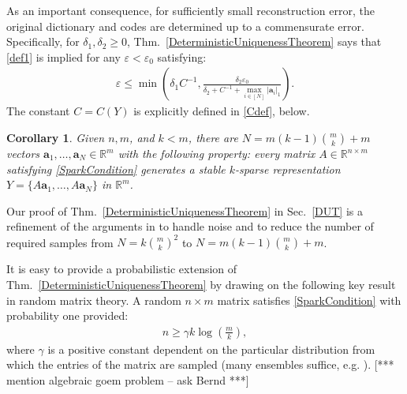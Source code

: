 \documentclass[journal, twocolumn]{IEEEtran}
\newtheorem{corollary}{Corollary}
\begin{document}

As an important consequence, for sufficiently small reconstruction error, the original dictionary and codes are determined up to a commensurate error. Specifically, for $\delta_1, \delta_2 \geq 0$, Thm.~\ref{DeterministicUniquenessTheorem} says that \eqref{def1} is implied for any $\varepsilon < \varepsilon_0$ satisfying:
\begin{align*}
\varepsilon \leq \min \left( \delta_1 C^{-1}, \frac{ \delta_2 \varepsilon_0}{\delta_2 + C^{-1} + \max_{i \in [N]} |\mathbf{a}_i|_1} \right).
\end{align*}
The constant $C = C(Y)$ is explicitly defined in \eqref{Cdef}, below. 

\begin{corollary}\label{DeterministicUniquenessCorollary}
Given $n, m$, and $k < m$, there are $N =  m(k-1){m \choose k}+m$ vectors \mbox{$\mathbf{a}_1, \ldots, \mathbf{a}_N \in \mathbb{R}^m$} with the following property: every matrix $A \in \mathbb{R}^{n \times m}$ satisfying \eqref{SparkCondition} generates a stable $k$-sparse representation $Y = \{A\mathbf{a}_1, \ldots, A\mathbf{a}_N\}$ in $\mathbb R^m$.
\end{corollary}

Our proof of Thm.~\ref{DeterministicUniquenessTheorem} in Sec.~\ref{DUT} is a refinement of the arguments in \cite{Hillar15} to handle noise and to reduce the number of required samples from $N=k{m \choose k}^2$ to $N = m(k-1){m \choose k}+m$. 

It is easy to provide a probabilistic extension of Thm.~\ref{DeterministicUniquenessTheorem} by drawing on the following key result in random matrix theory. A random $n \times m$ matrix satisfies \eqref{SparkCondition} with probability one 
provided:
\begin{align}\label{CScondition}
n \geq \gamma k\log\left(\frac{m}{k}\right),
\end{align}
where $\gamma$ is a positive constant dependent on the particular distribution from which the entries of the matrix are sampled (many ensembles suffice, e.g. \cite[Sec.~4]{Baraniuk08}). 
[*** mention algebraic goem problem --  ask Bernd ***]
\end{document}
